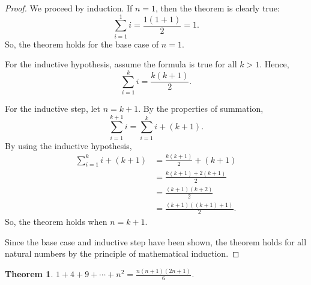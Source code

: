 \documentclass[headings=standardclasses]{scrartcl}
\newtheorem{theorem}{Theorem}[subsection]
\theoremstyle{definition}
\begin{document}
\begin{proof}
  We proceed by induction. If \(n = 1\), then the theorem is clearly true:
  \begin{equation*}
    ∑_{i = 1}^1 i = \frac{1(1 + 1)}{2} = 1.
  \end{equation*}
  So, the theorem holds for the base case of \(n = 1\).

  For the inductive hypothesis, assume the formula is true for all \(k > 1\).
  Hence,
  \begin{equation*}
    ∑_{i = 1}^k i = \frac{k(k + 1)}{2}.
  \end{equation*}

  For the inductive step, let \(n = k + 1\). By the properties of summation,
  \begin{equation*}
    ∑_{i = 1}^{k + 1} i = \sum_{i = 1}^{k} i + (k + 1).
  \end{equation*}
  By using the inductive hypothesis,
  \begin{equation*}
  \begin{split}
    ∑_{i = 1}^{k} i + (k + 1) &= \frac{k(k + 1)}{2} + (k + 1) \\
                              &= \frac{k(k + 1) + 2(k + 1)}{2} \\
                              &= \frac{(k + 1)(k + 2)}{2} \\
                              &= \frac{(k + 1)((k + 1) + 1)}{2}.
  \end{split}
  \end{equation*}
  So, the theorem holds when \(n = k + 1\).

  Since the base case and inductive step have been shown, the theorem holds for
  all natural numbers by the principle of mathematical induction.
\end{proof}

\begin{theorem}
  \(\displaystyle 1 + 4 + 9 + \cdots + n^2 = \frac{n(n + 1)(2n + 1)}{6}\).
\end{theorem}
\end{document}
